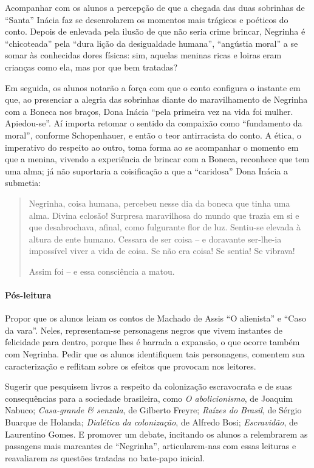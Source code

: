 \documentclass[11pt]{extarticle}
\begin{document}
Acompanhar com os alunos a percepção de que a chegada das duas sobrinhas
de ``Santa'' Inácia faz se desenrolarem os momentos mais trágicos e
poéticos do conto. Depois de enlevada pela ilusão de que não seria crime
brincar, Negrinha é ``chicoteada'' pela ``dura lição da desigualdade
humana'', ``angústia moral'' a se somar às conhecidas dores físicas:
sim, aquelas meninas ricas e loiras eram crianças como ela, mas por que
bem tratadas?

Em seguida, os alunos notarão a força com que o conto configura o
instante em que, ao presenciar a alegria das sobrinhas diante do
maravilhamento de Negrinha com a Boneca nos braços, Dona Inácia ``pela
primeira vez na vida foi mulher. Apiedou-se''. Aí importa retomar o
sentido da compaixão como ``fundamento da moral'', conforme
Schopenhauer, e então o teor antirracista do conto. A ética, o
imperativo do respeito ao outro, toma forma ao se acompanhar o momento
em que a menina, vivendo a experiência de brincar com a Boneca,
reconhece que tem uma alma; já não suportaria a coisificação a que a
``caridosa'' Dona Inácia a submetia:

\begin{quote}
Negrinha, coisa humana, percebeu nesse dia da boneca que tinha uma alma.
Divina eclosão! Surpresa maravilhosa do mundo que trazia em si e que
desabrochava, afinal, como fulgurante flor de luz. Sentiu-se elevada à
altura de ente humano. Cessara de ser coisa -- e doravante ser-lhe-ia
impossível viver a vida de coisa. Se não era coisa! Se sentia! Se
vibrava!

Assim foi -- e essa consciência a matou.
\end{quote}


\asterisc\paragraph{Pós-leitura}

Propor que os alunos leiam os contos de Machado de Assis ``O alienista''
e ``Caso da vara''. Neles, representam-se personagens negros que vivem
instantes de felicidade para dentro, porque lhes é barrada a expansão, o
que ocorre também com Negrinha. Pedir que os alunos identifiquem tais
personagens, comentem sua caracterização e reflitam sobre os efeitos que
provocam nos leitores.

Sugerir que pesquisem livros a respeito da colonização escravocrata e de
suas consequências para a sociedade brasileira, como \emph{O
abolicionismo}, de Joaquim Nabuco; \emph{Casa-grande \& senzala}, de
Gilberto Freyre; \emph{Raízes do Brasil}, de Sérgio Buarque de Holanda;
\emph{Dialética da colonização}, de Alfredo Bosi; \emph{Escravidão}, de
Laurentino Gomes. E promover um debate, incitando os alunos a
relembrarem as passagens mais marcantes de ``Negrinha'', articularem-nas
com essas leituras e reavaliarem as questões tratadas no bate-papo
inicial.
\end{document}
